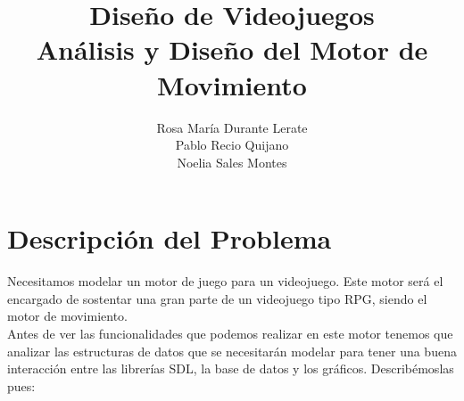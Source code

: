 \documentclass[a4paper,10pt]{article}
\title{Diseño de Videojuegos \\ Análisis y Diseño del Motor de Movimiento }
\author{Rosa María Durante Lerate\\Pablo Recio Quijano\\Noelia Sales Montes}
\begin{document}
\maketitle


\tableofcontents

\section{Descripción del Problema}

Necesitamos modelar un motor de juego para un videojuego. Este motor será el
encargado de sostentar una gran parte de un videojuego tipo RPG, siendo el motor
de movimiento. \\
 
Antes de ver las funcionalidades que podemos realizar en este motor tenemos que
analizar las estructuras de datos que se necesitarán modelar para tener una
buena interacción entre las librerías SDL, la base de datos y los gráficos.
Describémoslas pues:
\end{document}
